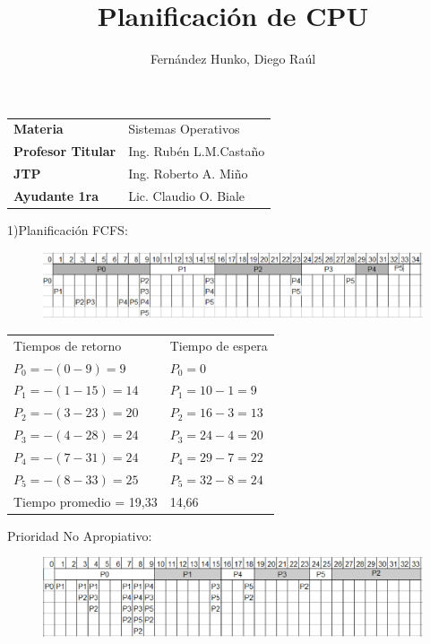 \documentclass[twoside, a4paper]{article}
\title{\Huge{Planif\mbox{}icaci\'on de CPU}}
\author{\Large{Fern\'andez Hunko, Diego Ra\'ul}}
\begin{document}
\maketitle

\begin{tabular}{l l}
\textbf{\large{Materia}} & \large{Sistemas Operativos} \\
\textbf{\large{Profesor Titular}} & \large{Ing. Rub\'en L.M.Casta\~no} \\      
\textbf{\large{JTP}} & \large{Ing. Roberto A. Mi\~no} \\
\textbf{\large{Ayudante 1ra}} & \large{Lic. Claudio O. Biale} \\
\end{tabular}

\newpage

1)Planificaci\'on FCFS:\\
\begin{figure}[!htb]
\includegraphics[scale=0.60]{FCFS.eps}
\end{figure}
\begin{tabular}{l l}
Tiempos de retorno & Tiempo de espera\\
$P_0 =-(0 - 9)= 9$ & $P_0 = 0$ \\
$P_1 =-(1 - 15)= 14$ & $P_1 =10-1=9$ \\
$P_2 =-(3 - 23)= 20$ & $P_2 =16-3=13$\\
$P_3 =-(4 - 28)= 24$ & $P_3 =24-4=20$\\
$P_4 =-(7 - 31)= 24$ & $P_4 =29-7=22$\\
$P_5 =-(8 - 33)= 25$ & $P_5 =32-8=24$\\
Tiempo promedio = 19,33 & 14,66
\end{tabular}
\newline
Prioridad No Apropiativo:\\
\begin{figure}[!htb]
\includegraphics[scale=0.60]{Prioridad-noApropiativo.eps}
\end{figure}
\end{document}
